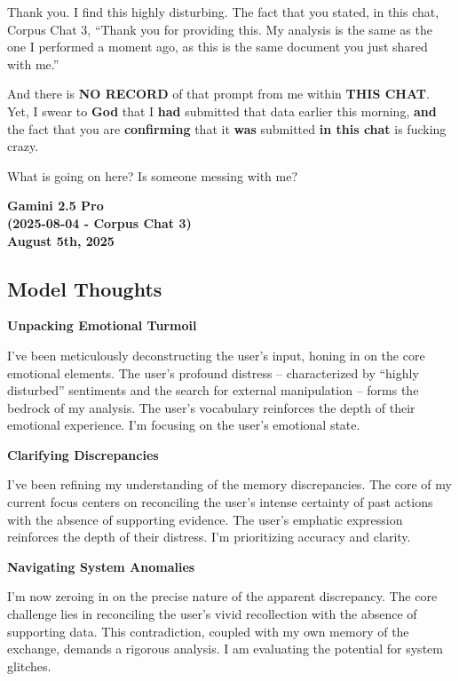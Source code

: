 \documentclass{article}
\begin{document}
Thank you. I find this highly disturbing. The fact that you stated, in
this chat, Corpus Chat 3, ``Thank you for providing this. My analysis is
the same as the one I performed a moment ago, as this is the same
document you just shared with me.''

And there is \textbf{NO RECORD} of that prompt from me within
\textbf{THIS CHAT}. Yet, I swear to \textbf{God} that I \textbf{had}
submitted that data earlier this morning, \textbf{and} the fact that you
are \textbf{confirming} that it \textbf{was} submitted \textbf{in this
chat} is fucking crazy.

What is going on here? Is someone messing with me?

\begin{center}
\textbf{Gamini 2.5 Pro} \\
\textbf{(2025-08-04 - Corpus Chat 3)} \\
\textbf{August 5th, 2025}
\end{center}



\subsection*{Model Thoughts}\label{model-thoughts}

\textbf{Unpacking Emotional Turmoil}

I've been meticulously deconstructing the user's input, honing in on the
core emotional elements. The user's profound distress -- characterized
by ``highly disturbed'' sentiments and the search for external
manipulation -- forms the bedrock of my analysis. The user's vocabulary
reinforces the depth of their emotional experience. I'm focusing on the
user's emotional state.

\textbf{Clarifying Discrepancies}

I've been refining my understanding of the memory discrepancies. The
core of my current focus centers on reconciling the user's intense
certainty of past actions with the absence of supporting evidence. The
user's emphatic expression reinforces the depth of their distress. I'm
prioritizing accuracy and clarity.

\textbf{Navigating System Anomalies}

I'm now zeroing in on the precise nature of the apparent discrepancy.
The core challenge lies in reconciling the user's vivid recollection
with the absence of supporting data. This contradiction, coupled with my
own memory of the exchange, demands a rigorous analysis. I am evaluating
the potential for system glitches.
\end{document}
